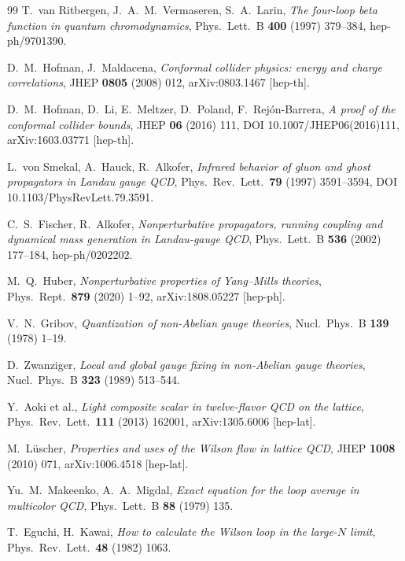 {\begin{thebibliography}{99}
 T.~van Ritbergen, J.~A.~M.~Vermaseren, S.~A.~Larin, \emph{The four-loop beta
  function in quantum chromodynamics}, Phys.\ Lett.\ B \textbf{400} (1997) 379--384,
  hep-ph/9701390.

 D.~M.~Hofman, J.~Maldacena, \emph{Conformal collider physics:
  energy and charge correlations}, JHEP \textbf{0805} (2008) 012, arXiv:0803.1467 [hep-th].

 D.~M.~Hofman, D.~Li, E.~Meltzer, D.~Poland, F.~Rej\'on-Barrera, \emph{A
  proof of the conformal collider bounds}, JHEP \textbf{06} (2016) 111,
  DOI 10.1007/JHEP06(2016)111, arXiv:1603.03771 [hep-th].

 L.~von Smekal, A.~Hauck, R.~Alkofer, \emph{Infrared behavior of gluon and
  ghost propagators in Landau gauge QCD}, Phys.\ Rev.\ Lett.\ \textbf{79} (1997) 3591--3594,
  DOI 10.1103/PhysRevLett.79.3591.

 C.~S.~Fischer, R.~Alkofer, \emph{Nonperturbative propagators, running
  coupling and dynamical mass generation in Landau-gauge QCD}, Phys.\ Lett.\ B \textbf{536}
  (2002) 177--184, hep-ph/0202202.

 M.~Q.~Huber, \emph{Nonperturbative properties of Yang--Mills theories},
  Phys.\ Rept.\ \textbf{879} (2020) 1--92, arXiv:1808.05227 [hep-ph].

 V.~N.~Gribov, \emph{Quantization of non-Abelian gauge theories}, Nucl.\ Phys.\
  B \textbf{139} (1978) 1--19.

 D.~Zwanziger, \emph{Local and global gauge fixing in non-Abelian gauge
  theories}, Nucl.\ Phys.\ B \textbf{323} (1989) 513--544.

 Y.~Aoki et al., \emph{Light composite scalar in twelve-flavor QCD on the
  lattice}, Phys.\ Rev.\ Lett.\ \textbf{111} (2013) 162001, arXiv:1305.6006 [hep-lat].

 M.~L\"uscher, \emph{Properties and uses of the Wilson flow in lattice
  QCD}, JHEP \textbf{1008} (2010) 071, arXiv:1006.4518 [hep-lat].

 Yu.~M.~Makeenko, A.~A.~Migdal, \emph{Exact equation for the loop
  average in multicolor QCD}, Phys.\ Lett.\ B \textbf{88} (1979) 135.

 T.~Eguchi, H.~Kawai, \emph{How to calculate the Wilson loop in the
  large-$N$ limit}, Phys.\ Rev.\ Lett.\ \textbf{48} (1982) 1063.


\end{thebibliography}}
